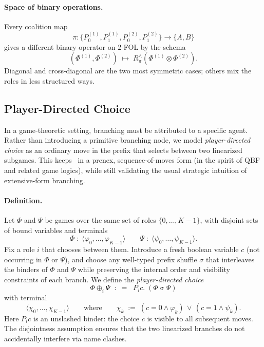 \paragraph{Space of binary operations.}
Every coalition map
\[
\pi : \{ P_0^{(1)}, P_1^{(1)}, P_0^{(2)}, P_1^{(2)} \} \to \{A,B\}
\]
gives a different binary operator on 2-FOL by the schema
\[
(\Phi^{(1)},\Phi^{(2)}) \;\mapsto\; R_\pi^{\wedge}(\Phi^{(1)} \otimes \Phi^{(2)}).
\]
Diagonal and cross-diagonal are the two most symmetric cases; others mix the
roles in less structured ways.

\subsection{Player-Directed Choice}
\label{sec:player-choice}

In a game-theoretic setting, branching must be attributed to a specific agent.
Rather than introducing a primitive branching node, we model \emph{player-directed choice} as an ordinary move in the prefix that selects between two linearized subgames.
This keeps \KFOL\ in a prenex, sequence-of-moves form (in the spirit of QBF and related game logics), while still validating the usual strategic intuition of extensive-form branching.

\paragraph{Definition.}
Let $\Phi$ and $\Psi$ be games over the same set of roles $\{0,\dots,K-1\}$, with disjoint sets of bound variables and terminals
\[
  \Phi \;:\; \langle \varphi_0,\dots,\varphi_{K-1}\rangle
  \qquad
  \Psi \;:\; \langle \psi_0,\dots,\psi_{K-1}\rangle.
\]
Fix a role $i$ that chooses between them.
Introduce a fresh boolean variable $c$ (not occurring in $\Phi$ or $\Psi$), and choose any well-typed prefix shuffle
$\sigma$ that interleaves the binders of $\Phi$ and $\Psi$ while preserving the internal order and visibility constraints of each branch.
We define the \emph{player-directed choice}
\[
  \Phi \oplus_i \Psi
  \;\;:\;=\;\;
  P_i c.\;(\Phi \mathbin{\sigma} \Psi)
\]
with terminal
\[
  \langle \chi_0,\dots,\chi_{K-1}\rangle
  \qquad\text{where}\qquad
  \chi_k   \;:=\; (c = 0 \wedge \varphi_k) \,\vee\, (c = 1 \wedge \psi_k).
\]
Here $P_i c$ is an unslashed binder: the choice $c$ is visible to all subsequent moves.
The disjointness assumption ensures that the two linearized branches do not accidentally interfere via name clashes.

